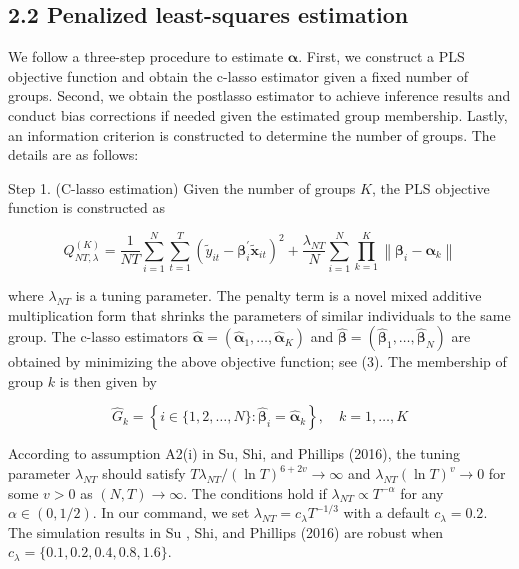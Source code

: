 \documentclass[10pt]{article}
\begin{document}
\subsection*{2.2 Penalized least-squares estimation}
We follow a three-step procedure to estimate $\boldsymbol{\alpha}$. First, we construct a PLS objective function and obtain the c-lasso estimator given a fixed number of groups. Second, we obtain the postlasso estimator to achieve inference results and conduct bias corrections if needed given the estimated group membership. Lastly, an information criterion is constructed to determine the number of groups. The details are as follows:

Step 1. (C-lasso estimation) Given the number of groups $K$, the PLS objective function is constructed as


\begin{equation*}
Q_{N T, \lambda}^{(K)}=\frac{1}{N T} \sum_{i=1}^{N} \sum_{t=1}^{T}\left(\widetilde{y}_{i t}-\boldsymbol{\beta}_{i}^{\prime} \widetilde{\mathbf{x}}_{i t}\right)^{2}+\frac{\lambda_{N T}}{N} \sum_{i=1}^{N} \prod_{k=1}^{K}\left\|\boldsymbol{\beta}_{i}-\boldsymbol{\alpha}_{k}\right\| \tag{3}
\end{equation*}


where $\lambda_{N T}$ is a tuning parameter. The penalty term is a novel mixed additive multiplication form that shrinks the parameters of similar individuals to the same group. The c-lasso estimators $\widehat{\boldsymbol{\alpha}}=\left(\widehat{\boldsymbol{\alpha}}_{1}, \ldots, \widehat{\boldsymbol{\alpha}}_{K}\right)$ and $\widehat{\boldsymbol{\beta}}=\left(\widehat{\boldsymbol{\beta}}_{1}, \ldots, \widehat{\boldsymbol{\beta}}_{N}\right)$ are obtained by minimizing the above objective function; see (3). The membership of group $k$ is then given by

$$
\widehat{G}_{k}=\left\{i \in\{1,2, \ldots, N\}: \widehat{\boldsymbol{\beta}}_{i}=\widehat{\boldsymbol{\alpha}}_{k}\right\}, \quad k=1, \ldots, K
$$

According to assumption A2(i) in Su, Shi, and Phillips (2016), the tuning parameter $\lambda_{N T}$ should satisfy $T \lambda_{N T} /(\ln T)^{6+2 v} \rightarrow \infty$ and $\lambda_{N T}(\ln T)^{v} \rightarrow 0$ for some $v>0$ as $(N, T) \rightarrow \infty$. The conditions hold if $\lambda_{N T} \propto T^{-\alpha}$ for any $\alpha \in(0,1 / 2)$. In our command, we set $\lambda_{N T}=c_{\lambda} T^{-1 / 3}$ with a default $c_{\lambda}=0.2$. The simulation results in Su , Shi, and Phillips (2016) are robust when $c_{\lambda}=\{0.1,0.2,0.4,0.8,1.6\}$.
\end{document}

